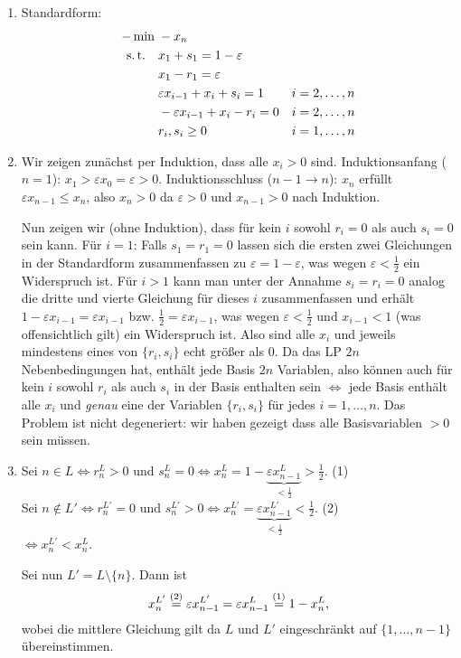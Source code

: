 \documentclass[11pt,german,a4paper,parskip=half-]{scrartcl}
\newcommand\st{\text{s.\,t.}\xspace}
\begin{document}
\begin{solution}
\begin{enumerate}
 \item Standardform:
\begin{align*}
 -\min\;&-x_n\\
\st\quad&x_1 + s_1 = 1-\varepsilon\\
&x_1-r_1 = \varepsilon\\
&\varepsilon x_{i-1} + x_i + s_i = 1&i=2,\dotsc,n\\
&-\varepsilon x_{i-1} + x_i - r_i = 0&i=2,\dotsc,n\\
&r_i,s_i \geq 0&i=1,\dotsc,n
\end{align*}
\item Wir zeigen zunächst per Induktion, dass alle $x_i>0$ sind. Induktionsanfang ($n=1$): $x_1 > \varepsilon x_0 = \varepsilon > 0$. Induktionsschluss ($n-1\rightarrow n$):
$x_n$ erfüllt $\varepsilon x_{n-1} \leq x_n$, also $x_n > 0$ da $\varepsilon >0$ und $x_{n-1} > 0$ nach Induktion.

Nun zeigen wir (ohne Induktion), dass für kein $i$ sowohl $r_i=0$ als auch $s_i=0$ sein kann. Für $i=1$: Falls $s_1=r_1=0$ lassen sich die ersten zwei Gleichungen in der Standardform zusammenfassen zu
$\varepsilon = 1-\varepsilon$, was wegen $\varepsilon < \frac12$ ein Widerspruch ist. Für $i>1$ kann man unter der Annahme $s_i=r_i=0$ analog die dritte und vierte Gleichung für dieses $i$ zusammenfassen
und erhält $1-\varepsilon x_{i-1} = \varepsilon x_{i-1}$ bzw. $\frac12 = \varepsilon x_{i-1}$, was wegen $\varepsilon < \frac12$ und $x_{i-1} < 1$ (was offensichtlich gilt) ein Widerspruch ist.
Also sind alle $x_i$ und jeweils mindestens eines von $\{r_i,s_i\}$ echt größer als $0$. Da das LP $2n$ Nebenbedingungen hat, enthält jede Basis $2n$ Variablen, also können auch für kein $i$ sowohl 
$r_i$ als auch $s_i$ in der Basis enthalten sein $\Leftrightarrow$ jede Basis enthält alle $x_i$ und \emph{genau} eine der Variablen $\{r_i,s_i\}$ für jedes $i=1,\dotsc,n$. Das Problem ist nicht degeneriert: wir haben
gezeigt dass alle Basisvariablen $>0$ sein müssen.
\item Sei $n \in L \Leftrightarrow r^L_n > 0$ und $s^L_n = 0 \Leftrightarrow x_n^L = 1-\underbrace{\varepsilon x_{n-1}^L}_{<\frac12} > \frac12$. (1)\\
Sei $n \notin L' \Leftrightarrow r_n^{L'} = 0$ und $s_n^{L'} > 0 \Leftrightarrow x_n^{L'} = \underbrace{\varepsilon x_{n-1}^{L'}}_{<\frac12} < \frac12$. (2)\\
$\Leftrightarrow x_n^{L'} < x_n^{L}$.

Sei nun $L' = L\setminus \{n\}$. Dann ist
\[x_n^{L'} \stackrel{\text{(2)}}{=} \varepsilon x_{n-1}^{L'} = \varepsilon x_{n-1}^L \stackrel{\text{(1)}}{=} 1-x_n^L\text{,}\]
wobei die mittlere Gleichung gilt da $L$ und $L'$ eingeschränkt auf $\{1,\dotsc,n-1\}$ übereinstimmen.

\end{enumerate}
\end{solution}
\end{document}
